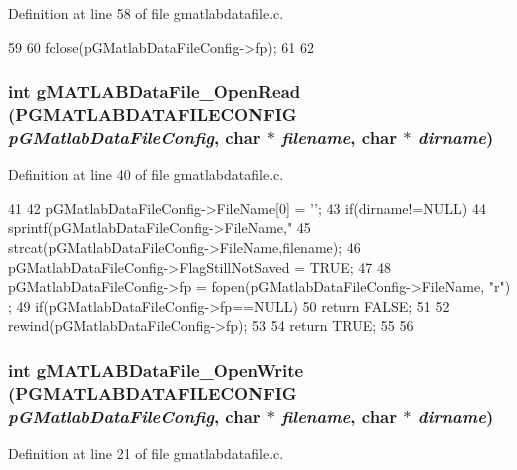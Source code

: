 Definition at line 58 of file gmatlabdatafile.c.


\begin{DoxyCode}
59 {
60         fclose(pGMatlabDataFileConfig->fp);
61 
62 }
\end{DoxyCode}
\subsubsection[{gMATLABDataFile\_\-OpenRead}]{\setlength{\rightskip}{0pt plus 5cm}int gMATLABDataFile\_\-OpenRead ({\bf PGMATLABDATAFILECONFIG} {\em pGMatlabDataFileConfig}, \/  char $\ast$ {\em filename}, \/  char $\ast$ {\em dirname})}\label{gmatlabdatafile_8h_a82d0dd8169ca82a67bb2d78ee1efbafe}


Definition at line 40 of file gmatlabdatafile.c.


\begin{DoxyCode}
41 {
42         pGMatlabDataFileConfig->FileName[0] = '\0';
43         if(dirname!=NULL)
44                 sprintf(pGMatlabDataFileConfig->FileName,"%
45         strcat(pGMatlabDataFileConfig->FileName,filename);
46         pGMatlabDataFileConfig->FlagStillNotSaved = TRUE;
47 
48         pGMatlabDataFileConfig->fp = fopen(pGMatlabDataFileConfig->FileName, "r")
      ;
49         if(pGMatlabDataFileConfig->fp==NULL){
50                 return FALSE;
51         }
52         rewind(pGMatlabDataFileConfig->fp);
53 
54         return TRUE;
55 
56 }
\end{DoxyCode}
\subsubsection[{gMATLABDataFile\_\-OpenWrite}]{\setlength{\rightskip}{0pt plus 5cm}int gMATLABDataFile\_\-OpenWrite ({\bf PGMATLABDATAFILECONFIG} {\em pGMatlabDataFileConfig}, \/  char $\ast$ {\em filename}, \/  char $\ast$ {\em dirname})}\label{gmatlabdatafile_8h_af53051d93a0e13032b8735451b077fb9}


Definition at line 21 of file gmatlabdatafile.c.


